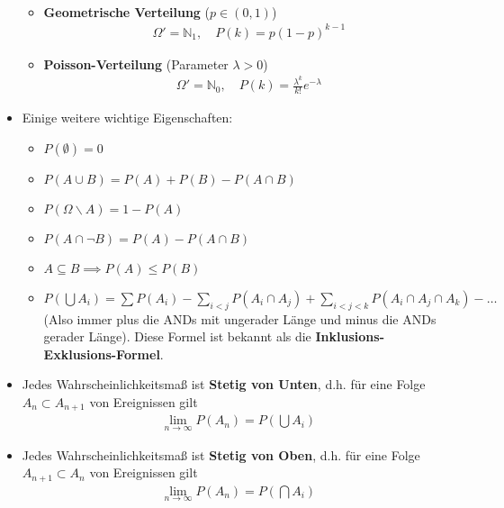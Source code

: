 \documentclass{scrartcl}
\begin{document}
\begin{itemize}
\begin{itemize}
\begin{align*}
        \end{align*}
        \item \textbf{Geometrische Verteilung} ($p \in (0,1)$)
        \begin{align*}
            \Omega' = \mathbb{N}_1,\quad P(k) = p(1-p)^{k-1}
        \end{align*}
        \item \textbf{Poisson-Verteilung} (Parameter $\lambda > 0$)
        \begin{align*}
            \Omega' = \mathbb{N}_0,\quad P(k) = \frac{\lambda^k}{k!}e^{-\lambda}
        \end{align*}
    \end{itemize}
    \item Einige weitere wichtige Eigenschaften:
    \begin{itemize}
        \item $P(\emptyset) = 0$
        \item $P(A \cup B) = P(A) + P(B) - P(A \cap B)$
        \item $P(\Omega \backslash A) = 1 - P(A)$
        \item $P(A \cap \neg B) = P(A) - P(A \cap B)$
        \item $A \subseteq B \implies P(A) \leq P(B)$
        \item $P(\bigcup A_i) = \sum P(A_i) - \sum_{i < j}P(A_i \cap A_j) + \sum_{i < j < k}P(A_i \cap A_j \cap A_k) - \hdots$\\
        (Also immer plus die ANDs mit ungerader Länge und minus die ANDs gerader Länge). Diese Formel ist bekannt als die \textbf{Inklusions-Exklusions-Formel}.
    \end{itemize}
    \item Jedes Wahrscheinlichkeitsmaß ist \textbf{Stetig von Unten}, d.h. für eine Folge $A_n \subset A_{n+1}$ von Ereignissen gilt
    \begin{align*}
        \lim_{n \to \infty} P(A_n) = P\left(\bigcup A_i\right)
    \end{align*}
    \item Jedes Wahrscheinlichkeitsmaß ist \textbf{Stetig von Oben}, d.h. für eine Folge $A_{n+1} \subset A_{n}$ von Ereignissen gilt
    \begin{align*}
        \lim_{n \to \infty} P(A_n) = P\left(\bigcap A_i\right)
    \end{align*}
\end{itemize}
\end{document}
